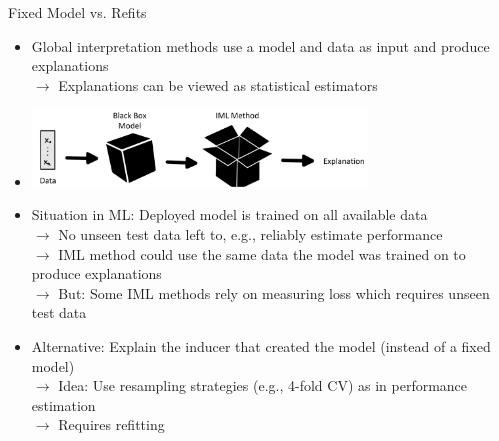 \documentclass[11pt,compress,t,notes=noshow, aspectratio=169, xcolor=table]{beamer}
\begin{document}
\begin{frame}{Fixed Model vs. Refits}
\begin{itemize}
    \item Global interpretation methods use a model and data as input and produce explanations\\
    $\rightarrow$ Explanations can be viewed as statistical estimators
    \item[] \centerline{\includegraphics[width=0.7\textwidth]{figure/fixed_model_vs_refits.jpg}}
    \item Situation in ML: Deployed model is trained on all available data\\
    $\rightarrow$ No unseen test data left to, e.g., reliably estimate performance\\
    $\rightarrow$ IML method could use the same data the model was trained on to produce explanations\\ 
    $\rightarrow$ But: Some IML methods rely on measuring loss which requires unseen test data
    \item Alternative: Explain the inducer that created the model (instead of a fixed model)\\
    $\rightarrow$ Idea: Use resampling strategies (e.g., 4-fold CV) as in performance estimation\\
    $\rightarrow$ Requires refitting
\end{itemize}
\end{frame}

%
\end{document}
